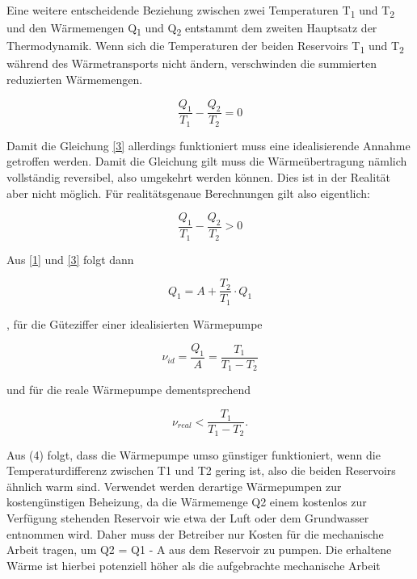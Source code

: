 \documentclass[titlepage=firstcover, captions=tableheading]{scrartcl}
\begin{document}
\noindent Eine weitere entscheidende Beziehung zwischen zwei Temperaturen T\textsubscript{1} und T\textsubscript{2} 
und den Wärmemengen Q\textsubscript{1} und Q\textsubscript{2} entstammt dem zweiten Hauptsatz der Thermodynamik.
Wenn sich die Temperaturen der beiden Reservoirs T\textsubscript{1} und T\textsubscript{2} während des Wärmetransports nicht ändern,
verschwinden die summierten reduzierten Wärmemengen.  

\begin{equation}\label{3}
    \frac{Q_1}{T_1} - \frac{Q_2}{T_2} = 0
\end{equation}

\noindent Damit die Gleichung \ref{3} allerdings funktioniert muss eine idealisierende Annahme getroffen werden. 
Damit die Gleichung gilt muss die Wärmeübertragung nämlich vollständig reversibel, also umgekehrt werden können. 
Dies ist in der Realität aber nicht möglich. Für realitätsgenaue Berechnungen gilt also eigentlich: 

\begin{displaymath}
    \frac{Q_1}{T_1} - \frac{Q_2}{T_2} > 0
\end{displaymath} 

Aus \ref{1} und \ref{3} folgt dann 

\begin{displaymath}
    Q_1 = A + \frac{T_2}{T_1} \cdot Q_1
\end{displaymath}

, für die Güteziffer einer idealisierten Wärmepumpe 

\begin{equation}
    \nu_{id} = \frac{Q_1}{A} = \frac{T_1}{T_1 - T_2}
\end{equation}

und für die reale Wärmepumpe dementsprechend  

\begin{displaymath}
    \nu_{real} < \frac{T_1}{T_1 - T_2} .
\end{displaymath}

\noindent Aus (4) folgt, dass die Wärmepumpe umso günstiger funktioniert, wenn die Temperaturdifferenz zwischen T1 und T2 gering ist, 
also die beiden Reservoirs ähnlich warm sind.
Verwendet werden derartige Wärmepumpen zur kostengünstigen Beheizung, 
da die Wärmemenge Q2 einem kostenlos zur Verfügung stehenden Reservoir wie etwa der Luft oder dem Grundwasser entnommen wird. 
Daher muss der Betreiber nur Kosten für die mechanische Arbeit tragen, um Q2 = Q1 - A aus dem Reservoir zu pumpen.
Die erhaltene Wärme ist hierbei potenziell höher als die aufgebrachte mechanische Arbeit
\end{document}
